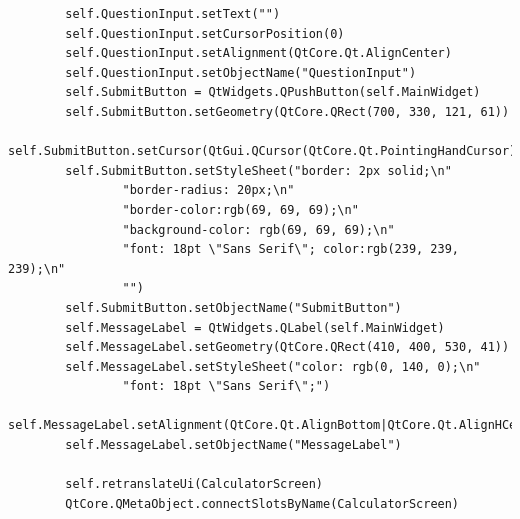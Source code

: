 \documentclass[12pt]{article}
\begin{document}
\begin{lstlisting}
        self.QuestionInput.setText("")
        self.QuestionInput.setCursorPosition(0)
        self.QuestionInput.setAlignment(QtCore.Qt.AlignCenter)
        self.QuestionInput.setObjectName("QuestionInput")
        self.SubmitButton = QtWidgets.QPushButton(self.MainWidget)
        self.SubmitButton.setGeometry(QtCore.QRect(700, 330, 121, 61))
        self.SubmitButton.setCursor(QtGui.QCursor(QtCore.Qt.PointingHandCursor))
        self.SubmitButton.setStyleSheet("border: 2px solid;\n"
                "border-radius: 20px;\n"
                "border-color:rgb(69, 69, 69);\n"
                "background-color: rgb(69, 69, 69);\n"
                "font: 18pt \"Sans Serif\"; color:rgb(239, 239, 239);\n"
                "")
        self.SubmitButton.setObjectName("SubmitButton")
        self.MessageLabel = QtWidgets.QLabel(self.MainWidget)
        self.MessageLabel.setGeometry(QtCore.QRect(410, 400, 530, 41))
        self.MessageLabel.setStyleSheet("color: rgb(0, 140, 0);\n"
                "font: 18pt \"Sans Serif\";")
        self.MessageLabel.setAlignment(QtCore.Qt.AlignBottom|QtCore.Qt.AlignHCenter)
        self.MessageLabel.setObjectName("MessageLabel")

        self.retranslateUi(CalculatorScreen)
        QtCore.QMetaObject.connectSlotsByName(CalculatorScreen)


\end{lstlisting}
\end{document}
